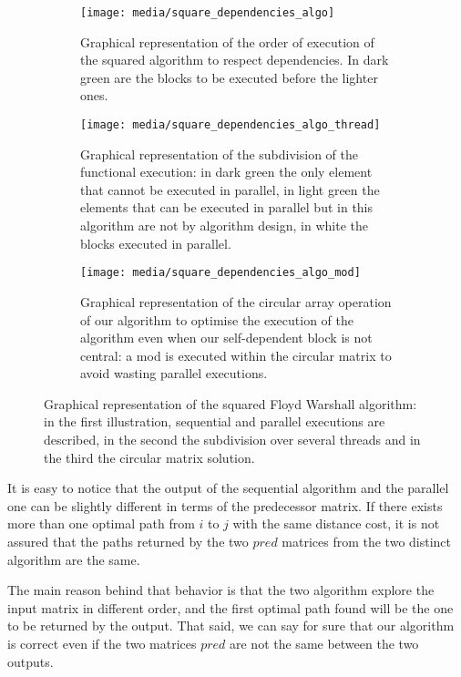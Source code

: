 \begin{figure}[htbp]
    \centering
    \begin{subfigure}[t]{0.3\textwidth}
        \texttt{[image: media/square\_dependencies\_algo]}
        
        \caption{Graphical representation of the order of execution of the squared algorithm to respect dependencies. In dark green are the blocks to be executed before the lighter ones.}
        \label{fig:square-dependecies-algo}
    \end{subfigure}
    \begin{subfigure}[t]{0.3\textwidth}
        \texttt{[image: media/square\_dependencies\_algo\_thread]}
        
        \caption{Graphical representation of the subdivision of the functional execution: in dark green the only element that cannot be executed in parallel, in light green the elements that can be executed in parallel but in this algorithm are not by algorithm design, in white the blocks executed in parallel.}
        \label{fig:square-dependecies-thread}
    \end{subfigure}
    \begin{subfigure}[t]{0.3\textwidth}
        \texttt{[image: media/square\_dependencies\_algo\_mod]}
        
        \caption{Graphical representation of the circular array operation of our algorithm to optimise the execution of the algorithm even when our self-dependent block is not central: a mod is executed within the circular matrix to avoid wasting parallel executions.}
        \label{fig:square-dependecies-circular}
    \end{subfigure}
    \caption{Graphical representation of the squared Floyd Warshall algorithm: in the first illustration, sequential and parallel executions are described, in the second the subdivision over several threads and in the third the circular matrix solution.}
        \label{fig:square-algo}
\end{figure}

It is easy to notice that the output of the sequential algorithm and the parallel one can be slightly different in terms of the predecessor matrix. If there exists more than one optimal path from \(i\) to \(j\) with the same distance cost, it is not assured that the paths returned by the two \(pred\) matrices from the two distinct algorithm are the same. 

The main reason behind that behavior is that the two algorithm explore the input matrix in different order, and the first optimal path found will be the one to be returned by the output. That said, we can say for sure that our algorithm is correct even if the two matrices \(pred\) are not the same between the two outputs.

\FloatBarrier
